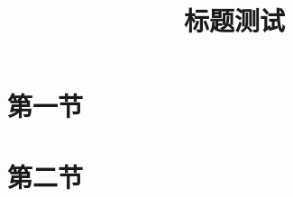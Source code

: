 \documentclass{ctexbeamer}
\title{标题测试}
\begin{document}
\begin{frame}
\titlepage
\end{frame}

\begin{frame}
	\tableofcontents
\end{frame}

\section{第一节}

\section{第二节}
\end{document}
